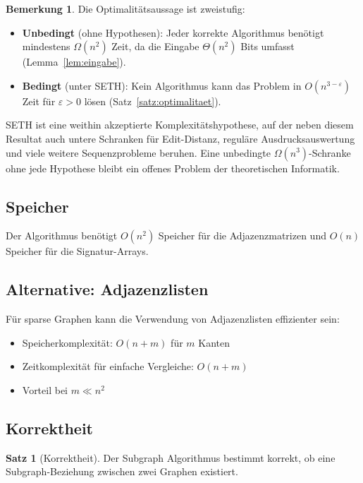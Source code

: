 ﻿\documentclass[a4paper,12pt]{article}
\theoremstyle{definition}
\newtheorem{satz}{Satz}
\newtheorem{bemerkung}{Bemerkung}
\begin{document}
\begin{bemerkung}
Die Optimalitätsaussage ist zweistufig:
\begin{itemize}
	\item \textbf{Unbedingt} (ohne Hypothesen): Jeder korrekte Algorithmus benötigt mindestens
	      $\Omega(n^2)$ Zeit, da die Eingabe $\Theta(n^2)$ Bits umfasst (Lemma~\ref{lem:eingabe}).
	\item \textbf{Bedingt} (unter SETH): Kein Algorithmus kann das Problem in $O(n^{3-\varepsilon})$
	      Zeit für $\varepsilon > 0$ lösen (Satz~\ref{satz:optimalitaet}).
\end{itemize}
SETH ist eine weithin akzeptierte Komplexitätshypothese, auf der neben diesem Resultat auch
untere Schranken für Edit-Distanz, reguläre Ausdrucksauswertung und viele weitere Sequenzprobleme
beruhen. Eine unbedingte $\Omega(n^3)$-Schranke ohne jede Hypothese bleibt ein offenes Problem
der theoretischen Informatik.
\end{bemerkung}

\subsection{Speicher}

Der Algorithmus benötigt $O(n^2)$ Speicher für die Adjazenzmatrizen und $O(n)$ Speicher für die Signatur-Arrays.

\subsection{Alternative: Adjazenzlisten}

Für sparse Graphen kann die Verwendung von Adjazenzlisten effizienter sein:

\begin{itemize}
	\item Speicherkomplexität: $O(n + m)$ für $m$ Kanten
	\item Zeitkomplexität für einfache Vergleiche: $O(n + m)$
	\item Vorteil bei $m \ll n^2$
\end{itemize}

\subsection{Korrektheit}

\begin{satz}[Korrektheit]
	Der Subgraph Algorithmus bestimmt korrekt, ob eine Subgraph-Beziehung zwischen zwei Graphen existiert.
\end{satz}
\end{document}
